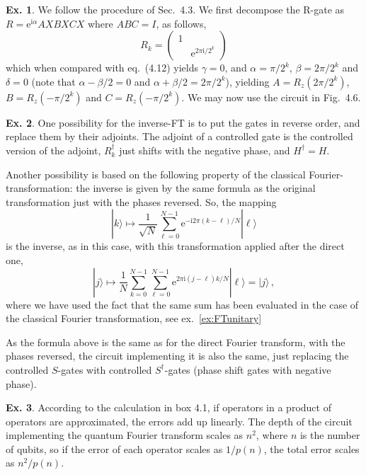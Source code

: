 \documentclass[a4paper,12pt]{article}
\def\e{\mathrm{e}}
\def\imagi{\mathrm{i}}
\theoremstyle{definition}
\newtheorem{exercise}{Ex.}[section]
\begin{document}
\begin{exercise}
 We follow the procedure of Sec.\ 4.3. We first decompose the R-gate as $R=\e^{\imagi \alpha}AXBXCX$ where $ABC=I$, as follows,
 \[
  R_k = \begin{pmatrix} 1 & \\ & \e^{2\pi\imagi/2^k} \end{pmatrix}
 \]
 which when compared with eq.\ (4.12) yields $\gamma=0$, and $\alpha=\pi/2^k$, $\beta=2\pi/2^k$ and $\delta=0$ (note that $\alpha-\beta/2=0$ and $\alpha+\beta/2=2\pi/2^k$), yielding
 $A=R_z(2\pi/2^k)$, $B=R_z(-\pi/2^k)$ and $C=R_z(-\pi/2^k)$.
 We may now use the circuit in Fig.\ 4.6.
\end{exercise}


\begin{exercise}
 One possibility for the inverse-FT is to put the gates in reverse order, and replace them by their adjoints. The adjoint of a controlled gate is the controlled version of the adjoint, $R_k^\dagger$ just shifts with the negative phase, and $H^\dagger=H$.
 
 Another possibility is based on the following property of the classical Fourier-transformation: the inverse is given by the same formula as the original transformation just with the phases reversed. So, the mapping
 \[
  |k\rangle \mapsto \frac{1}{\sqrt{N}}\sum_{\ell=0}^{N-1}\e^{-\imagi 2\pi(k-\ell)/N}|\ell\rangle
 \]
 is the inverse, as in this case, with this transformation applied after the direct one,
 \[
  |j\rangle \mapsto \frac{1}{N}\sum_{k=0}^{N-1}\sum_{\ell=0}^{N-1}\e^{2\pi\imagi (j-\ell)k/N}|\ell\rangle = |j\rangle\,,
 \]
 where we have used the fact that the same sum has been evaluated in the case of the classical Fourier transformation, see ex.~\ref{ex:FTunitary}

 As the formula above is the same as for the direct Fourier transform, with the phases reversed, the circuit implementing it is also the same, just replacing the controlled $S$-gates with controlled $S^\dagger$-gates (phase shift gates with negative phase).
\end{exercise}

\begin{exercise}
 According to the calculation in box 4.1, if operators in a product of operators are approximated, the errors add up linearly. The depth of the circuit implementing the quantum Fourier transform scales as $n^2$, where $n$ is the number of qubits, so if the error of each operator scales as $1/p(n)$, the total error scales as $n^2/p(n)$.
\end{exercise}
\end{document}
